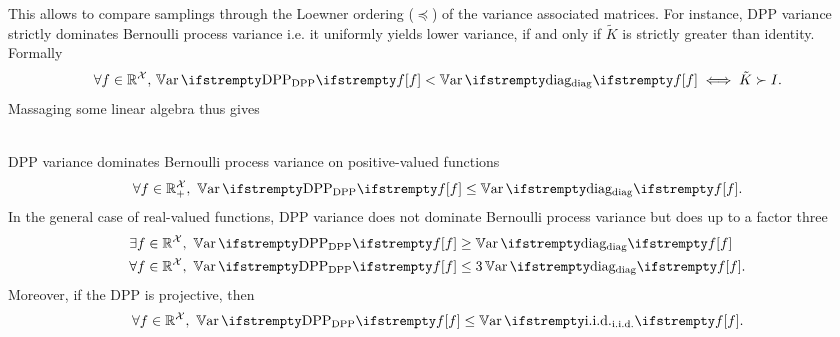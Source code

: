 This allows to compare samplings through the Loewner ordering ($\preceq$) of the variance associated matrices. For instance, DPP variance strictly dominates Bernoulli process variance i.e. it uniformly yields lower variance, if and only if $\tilde K$ is strictly greater than identity. Formally 
\begin{equation*}
	\forall \query \in \RR^{\mathcal{X}}, \, \Var{\textrm{DPP}}{f} < \Var{\textrm{diag}}{f} \iff \tilde K \succ I.
\end{equation*}
Massaging some linear algebra thus gives

\begin{tcolorbox}
	\begin{proposition}\ \\
		\label{prop__var_comp}
		DPP variance dominates Bernoulli process variance on positive-valued functions
		\begin{align}
			\label{eqn__posvar}
			\forall \query \in \RR_+^{\mathcal{X}},\ \Var{\textrm{DPP}}{f} \leq \Var{\textrm{diag}}{f}.
		\end{align}
		In the general case of real-valued functions, DPP variance does not dominate Bernoulli process variance but does up to a factor three
		\begin{align}
			\label{eqn__nodom}
			&\exists \query \in \RR^{\mathcal{X}},\ \Var{\textrm{DPP}}{f} \geq \Var{\textrm{diag}}{f}\\
			\label{eqn__domtwo}
			&\forall \query \in \RR^{\mathcal{X}},\ \Var{\textrm{DPP}}{f} \leq 3\Var{\textrm{diag}}{f}.
		\end{align}
		Moreover, if the DPP is projective, then
		\begin{align}
			\label{eqn__projiid}
			\forall \query \in \RR^{\mathcal{X}},\ \Var{\textrm{DPP}}{f} \leq \Var{\textrm{i.i.d.}}{f}.
		\end{align}
	\end{proposition}
\end{tcolorbox}



